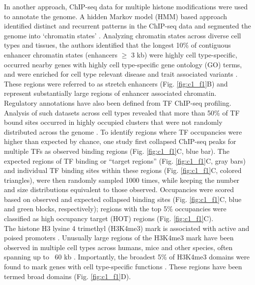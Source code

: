 In another approach, ChIP-seq data for multiple histone modifications were used to annotate the genome. A hidden Markov model (HMM) based approach identified distinct and recurrent patterns in the ChIP-seq data and segmented the genome into ‘chromatin states’ \cite{ernstMappingAnalysisChromatin2011, ernstChromHMMAutomatingChromatin2012}. Analyzing chromatin states across diverse cell types and tissues, the authors identified that the longest 10\% of contiguous enhancer chromatin states (enhancers $\geq$ 3 kb) were highly cell type-specific, occurred nearby genes with highly cell type-specific gene ontology (GO) terms, and were enriched for cell type relevant disease and trait associated variants \cite{parkerChromatinStretchEnhancer2013}. These regions were referred to as stretch enhancers \cite{parkerChromatinStretchEnhancer2013} (Fig. \ref{fig:c1_f1}B) and represent substantially large regions of enhancer associated chromatin. \\

Regulatory annotations have also been defined from TF ChIP-seq profiling. Analysis of such datasets across cell types revealed that more than 50\% of TF bound sites occurred in highly occupied clusters that were not randomly distributed across the genome \cite{moormanHotspotsTranscriptionFactor2006, themodencodeconsortiumIdentificationFunctionalElements2010, theencodeprojectconsortiumIntegratedEncyclopediaDNA2012, boyleComparativeAnalysisRegulatory2014}. To identify regions where TF occupancies were higher than expected by chance, one study first collapsed ChIP-seq peaks for multiple TFs as observed binding regions (Fig.  \ref{fig:c1_f1}C, blue bar). The expected regions of TF binding or “target regions” (Fig.  \ref{fig:c1_f1}C, gray bars) and individual TF binding sites within these regions (Fig.  \ref{fig:c1_f1}C, colored triangles), were then randomly sampled 1000 times, while keeping the number and size distributions equivalent to those observed. Occupancies were scored based on observed and expected collapsed binding sites (Fig.  \ref{fig:c1_f1}C, blue and green blocks, respectively); regions with the top 5\% occupancies were classified as high occupancy target (HOT) regions (Fig. \ref{fig:c1_f1}C). \\

The histone H3 lysine 4 trimethyl (H3K4me3) mark is associated with active and poised promoters \cite{bernsteinBivalentChromatinStructure2006, mikkelsenGenomewideMapsChromatin2007,adliGenomewideChromatinMaps2010}. Unusually large regions of the H3K4me3 mark have been observed in multiple cell types across humans, mice and other species, often spanning up to ~60 kb \cite{adliGenomewideChromatinMaps2010,benayounH3K4me3BreadthLinked2014,chenBroadH3K4me3Associated2015}. Importantly, the broadest 5\% of H3K4me3 domains were found to mark genes with cell type-specific functions \cite{benayounH3K4me3BreadthLinked2014,thibodeauChromatinInteractionNetworks2017}. These regions have been termed broad domains (Fig. \ref{fig:c1_f1}D). \\

